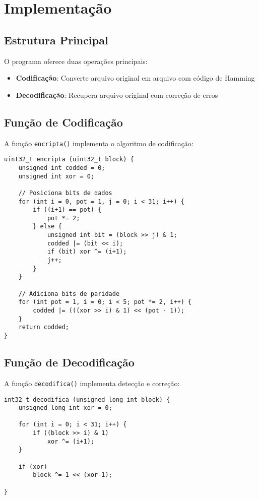 \documentclass[12pt,a4paper]{article}
\begin{document}
\section{Implementação}

\subsection{Estrutura Principal}
O programa oferece duas operações principais:
\begin{itemize}
    \item \textbf{Codificação}: Converte arquivo original em arquivo com código de Hamming
    \item \textbf{Decodificação}: Recupera arquivo original com correção de erros
\end{itemize}

\subsection{Função de Codificação}
A função \texttt{encripta()} implementa o algoritmo de codificação:

\begin{lstlisting}[basicstyle=\tiny\ttfamily]
uint32_t encripta (uint32_t block) {
    unsigned int codded = 0;
    unsigned int xor = 0;
    
    // Posiciona bits de dados
    for (int i = 0, pot = 1, j = 0; i < 31; i++) {
        if ((i+1) == pot) {
            pot *= 2;
        } else {
            unsigned int bit = (block >> j) & 1;
            codded |= (bit << i);
            if (bit) xor ^= (i+1);
            j++;
        }
    }
    
    // Adiciona bits de paridade
    for (int pot = 1, i = 0; i < 5; pot *= 2, i++) {
        codded |= (((xor >> i) & 1) << (pot - 1));
    }
    return codded;
}
\end{lstlisting}

\subsection{Função de Decodificação}
A função \texttt{decodifica()} implementa detecção e correção:

\begin{lstlisting}[basicstyle=\tiny\ttfamily]
int32_t decodifica (unsigned long int block) {
    unsigned long int xor = 0;
    
    for (int i = 0; i < 31; i++) {
        if ((block >> i) & 1)
            xor ^= (i+1);
    }
    
    if (xor) 
        block ^= 1 << (xor-1);
    
}
\end{lstlisting}
\end{document}
